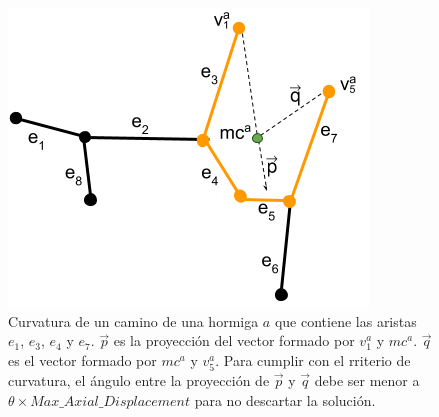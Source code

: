 \begin{figure}[h]
    \centering
    \includegraphics[scale=0.8]{imagenes/ant_curvature_case.png}
    \caption[Curvatura de un camino de una hormiga $a$ que contiene las aristas $e_1$, $e_3$, $e_4$ y $e_7$.]{Curvatura de un camino de una hormiga $a$ que contiene las aristas $e_1$, $e_3$, $e_4$ y $e_7$. $\Vec{p}$ es la proyecci\'on del vector formado por $v^{a}_1$ y $mc^{a}$. $\Vec{q}$ es el vector formado por $mc^{a}$ y $v^{a}_5$. Para cumplir con el rriterio de curvatura, el \'angulo entre la proyecci\'on de $\Vec{p}$ y $\Vec{q}$ debe ser menor a $\theta \times Max\_Axial\_Displacement$ para no descartar la soluci\'on. }
    \label{fig:antCurvCase}
\end{figure}

